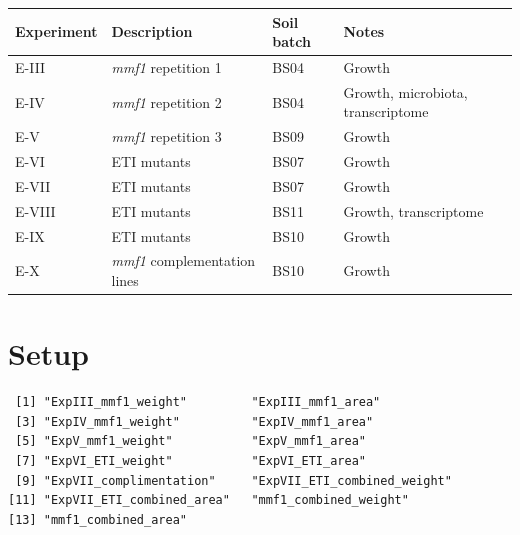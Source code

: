 \documentclass[
  10pt,
]{article}
\begin{document}
\begin{longtable}[]{@{}
  >{\raggedright\arraybackslash}p{}
  >{\raggedright\arraybackslash}p{}
  >{\raggedright\arraybackslash}p{}
  >{\raggedright\arraybackslash}p{}@{}}
\toprule\noalign{}
\begin{minipage}[b]{\linewidth}\raggedright
Experiment
\end{minipage} & \begin{minipage}[b]{\linewidth}\raggedright
Description
\end{minipage} & \begin{minipage}[b]{\linewidth}\raggedright
Soil batch
\end{minipage} & \begin{minipage}[b]{\linewidth}\raggedright
Notes
\end{minipage} \\
\midrule\noalign{}
\endhead
\bottomrule\noalign{}
\endlastfoot
E-III & \emph{mmf1} repetition 1 & BS04 & Growth \\
E-IV & \emph{mmf1} repetition 2 & BS04 & Growth, microbiota,
transcriptome \\
E-V & \emph{mmf1} repetition 3 & BS09 & Growth \\
E-VI & ETI mutants & BS07 & Growth \\
E-VII & ETI mutants & BS07 & Growth \\
E-VIII & ETI mutants & BS11 & Growth, transcriptome \\
E-IX & ETI mutants & BS10 & Growth \\
E-X & \emph{mmf1} complementation lines & BS10 & Growth \\
\end{longtable}

\section{Setup}\label{setup}

\begin{verbatim}
 [1] "ExpIII_mmf1_weight"         "ExpIII_mmf1_area"          
 [3] "ExpIV_mmf1_weight"          "ExpIV_mmf1_area"           
 [5] "ExpV_mmf1_weight"           "ExpV_mmf1_area"            
 [7] "ExpVI_ETI_weight"           "ExpVI_ETI_area"            
 [9] "ExpVII_complimentation"     "ExpVII_ETI_combined_weight"
[11] "ExpVII_ETI_combined_area"   "mmf1_combined_weight"      
[13] "mmf1_combined_area"        
\end{verbatim}
\end{document}
